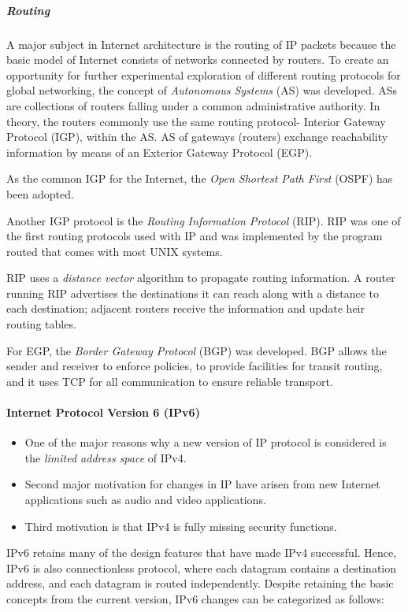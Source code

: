 \subparagraph{Routing}
A major subject in Internet architecture is the routing of IP packets because the basic	model of Internet consists of networks connected by routers. To create an opportunity for further experimental exploration of different routing protocols for global networking, the concept of \textit{Autonomous Systems} (AS) was developed. ASs are collections of routers falling under a common administrative authority. In theory, the routers commonly use the same routing protocol- Interior Gateway Protocol (IGP), within the AS.	AS of gateways (routers) exchange reachability information by means of an Exterior Gateway Protocol (EGP).

As the common IGP for the Internet, the \textit{Open Shortest Path First} (OSPF) has been adopted.

Another IGP protocol is the \textit{Routing Information Protocol} (RIP). RIP was one of	the first routing protocols used with IP and was implemented by the program routed that comes with most UNIX systems.

RIP uses a \textit{distance vector} algorithm to propagate routing information. A router running RIP advertises the destinations it can reach along	with a distance to each destination; adjacent routers receive the information and update heir routing tables.

For EGP, the \textit{Border Gateway Protocol} (BGP) was developed. BGP allows the sender and receiver to enforce policies, to provide facilities for transit routing, and it uses TCP for all communication to ensure	reliable transport.
	
\paragraph[IPv6]{Internet Protocol Version 6 (IPv6)}
\begin{itemize}
	\item One of the major reasons why a new version of IP protocol is considered is the \textit{limited address space} of IPv4. 
	\item Second major motivation for changes in IP have arisen from new Internet applications such as audio and video applications.
	\item Third motivation is that IPv4 is fully missing security functions.
\end{itemize}


IPv6 retains many of the design features that have made IPv4 successful. Hence, IPv6 is also connectionless protocol, where each datagram contains a destination address, and each datagram is routed independently. Despite retaining the basic concepts from the current version, IPv6 changes can be categorized as follows: 

